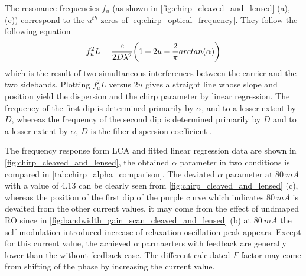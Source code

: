 The resonance frequencies $f_u$ (as shown in \autoref{fig:chirp_cleaved_and_lensed} (a), (c)) correspond to the $u^{th}$-zeros of \autoref{eq:chirp_optical_frequency}. They follow the following equation \cite{devaux1993simple}
\begin{equation}
    f_u^2L=\frac{c}{2D\lambda ^2}\qty(1+2u-\frac{2}{\pi}arctan(\alpha))
    \label{eq:LCA_equation}
\end{equation}
which is the result of two simultaneous interferences between the carrier and the two sidebands. Plotting $f_u^2L$ versus $2u$ gives a straight line whose slope and position yield the dispersion and the chirp parameter by linear regression. The frequency of the first dip is determined primarily by $\alpha$, and to a lesser extent by $D$, whereas the frequency of the second dip is determined primarily by $D$ and to a lesser extent by $\alpha$, $D$ is the fiber dispersion coefficient \cite{srinivasan1995using}.

The frequency response form LCA and fitted linear regression data are shown in \autoref{fig:chirp_cleaved_and_lensed}, the obtained $\alpha$ parameter in two conditions is compared in \autoref{tab:chirp_alpha_comparison}. The deviated $\alpha$ parameter at $80 \ mA$ with a value of 4.13 can be clearly seen from \autoref{fig:chirp_cleaved_and_lensed} (c), whereas the position of the first dip of the purple curve which indicates $80 \ mA$ is devaited from the other current values, it may come from the effect of undmaped RO since in \autoref{fig:bandwidth_gain_scan_cleaved_and_lensed} (b) at $80 \ mA$ the self-modulation introduced increase of relaxation oscillation peak appears. Except for this current value, the achieved $\alpha$ parmaerters with feedback are generally lower than the without feedback case. The different calculated $F$ factor may come from shifting of the phase by increasing the current value.


